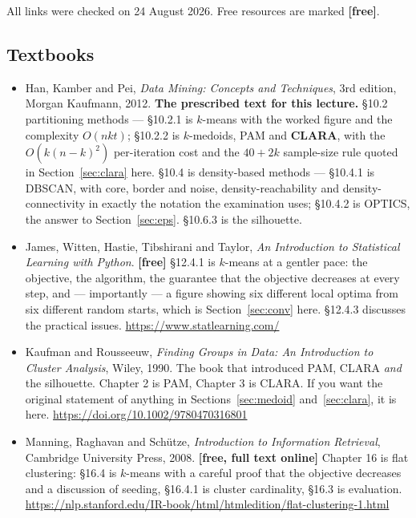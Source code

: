 \documentclass[11pt]{article}
\begin{document}
All links were checked on 24 August 2026. Free resources are marked
\textbf{[free]}.

\subsection*{Textbooks}

\begin{itemize}[leftmargin=*]
  \item Han, Kamber and Pei, \emph{Data Mining: Concepts and Techniques}, 3rd
    edition, Morgan Kaufmann, 2012. \textbf{The prescribed text for this
    lecture.} \S10.2 partitioning methods --- \S10.2.1 is $k$-means with the
    worked figure and the complexity $O(nkt)$; \S10.2.2 is $k$-medoids, PAM
    and \textbf{CLARA}, with the $O(k(n-k)^2)$ per-iteration cost and the
    $40+2k$ sample-size rule quoted in Section~\ref{sec:clara} here. \S10.4
    is density-based methods --- \S10.4.1 is DBSCAN, with core, border and
    noise, density-reachability and density-connectivity in exactly the
    notation the examination uses; \S10.4.2 is OPTICS, the answer to
    Section~\ref{sec:eps}. \S10.6.3 is the silhouette.
  \item James, Witten, Hastie, Tibshirani and Taylor, \emph{An Introduction to
    Statistical Learning with Python}. \textbf{[free]} \S12.4.1 is $k$-means
    at a gentler pace: the objective, the algorithm, the guarantee that the
    objective decreases at every step, and --- importantly --- a figure
    showing six different local optima from six different random starts, which
    is Section~\ref{sec:conv} here. \S12.4.3 discusses the practical issues.
    \url{https://www.statlearning.com/}
  \item Kaufman and Rousseeuw, \emph{Finding Groups in Data: An Introduction
    to Cluster Analysis}, Wiley, 1990. The book that introduced PAM, CLARA
    \emph{and} the silhouette. Chapter 2 is PAM, Chapter 3 is CLARA. If you
    want the original statement of anything in Sections~\ref{sec:medoid}
    and~\ref{sec:clara}, it is here. \url{https://doi.org/10.1002/9780470316801}
  \item Manning, Raghavan and Sch\"utze, \emph{Introduction to Information
    Retrieval}, Cambridge University Press, 2008. \textbf{[free, full text
    online]} Chapter 16 is flat clustering: \S16.4 is $k$-means with a careful
    proof that the objective decreases and a discussion of seeding, \S16.4.1
    is cluster cardinality, \S16.3 is evaluation.
    \url{https://nlp.stanford.edu/IR-book/html/htmledition/flat-clustering-1.html}

\end{itemize}
\end{document}
